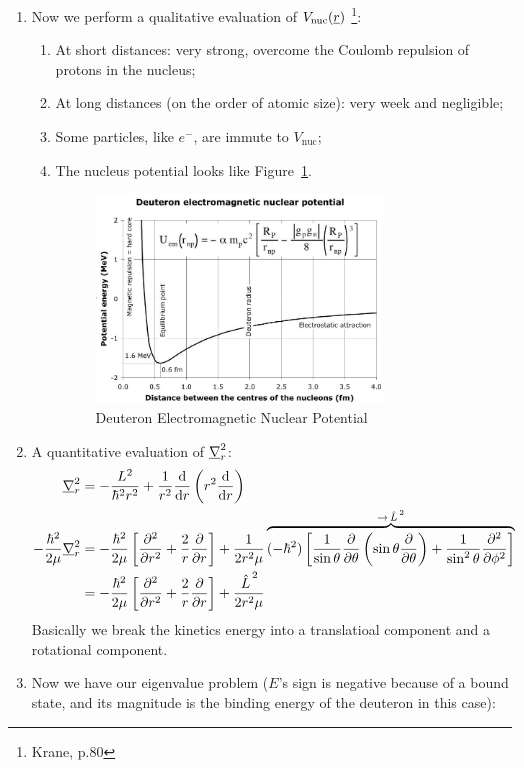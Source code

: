 \documentclass{school-22.101-notes}
\begin{document}
\begin{enumerate}
\item Now we perform a qualitative evaluation of $V_{\mathrm{nuc}} (\underline{r})$ \footnote{Krane, p.80}: 
    \begin{enumerate}
    \item At short distances: very strong, overcome the Coulomb repulsion of protons in the nucleus; 
    \item At long distances (on the order of atomic size): very week and negligible; 
    \item Some particles, like $e^-$, are immute to $V_{\mathrm{nuc}}$;
    \item The nucleus potential looks like Figure~\ref{nuclear-potential-radius}. 
    \begin{figure}
        \centering
        \includegraphics[width=3in]{images/deuteron/nuclear-potential-radius.png}
        \caption{Deuteron Electromagnetic Nuclear Potential\label{nuclear-potential-radius}}
    \end{figure}
    \end{enumerate}

\item A quantitative evaluation of $\underline{\nabla}_r^2$: 
\begin{align}
\underline{\nabla}_r^2 &= - \frac{L^2}{\hbar^2 r^2} + \frac{1}{r^2} \frac{\mathrm{d}}{\mathrm{d}r} \left( r^2 \frac{\mathrm{d}}{\mathrm{d}r} \right) \\
- \frac{\hbar^2}{2 \mu} \underline{\nabla}_r^2 &= - \frac{\hbar^2}{2 \mu} \left[ \frac{\partial^{2} }{\partial r ^{2}} + \frac{2}{r} \frac{\partial}{\partial r} \right] + \frac{1}{2 r^2 \mu} \overbrace{ (-\hbar^2) \left[ \frac{1}{\sin \theta} \frac{\partial}{\partial \theta} \left( \sin \theta \frac{\partial}{\partial \theta} \right) + \frac{1}{\sin^2 \theta} \frac{\partial^{2} }{\partial \phi ^{2}} \right]}^{\to \left. \hat{L} \right.^2}  \\
&= - \frac{\hbar^2}{2 \mu} \left[ \frac{\partial^{2} }{\partial r ^{2}} + \frac{2}{r} \frac{\partial}{\partial r} \right] + \frac{\left. \hat{L} \right.^2}{2 r^2 \mu} 
\end{align}
Basically we break the kinetics energy into a translatioal component and a rotational component. 

\item Now we have our eigenvalue problem ($E$'s sign is negative because of a bound state, and its magnitude is the binding energy of the deuteron in this case):


\end{enumerate}
\end{document}
